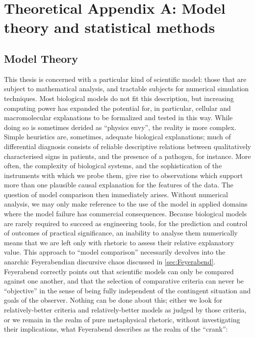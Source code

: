 \chapter{Theoretical Appendix A: Model theory and statistical methods}
\label{chap:theoryA}

\section{Model Theory}
\label{modeltheory}
This thesis is concerned with a particular kind of scientific model: those that are subject to mathematical analysis, and tractable subjects for numerical simulation techniques. Most biological models do not fit this description, but increasing computing power has expanded the potential for, in particular, cellular and macromolecular explanations to be formalized and tested in this way. While doing so is sometimes derided as ``physics envy'', the reality is more complex. Simple heuristics are, sometimes, adequate biological explanations; much of differential diagnosis consists of reliable descriptive relations between qualitatively characterised signs in patients, and the presence of a pathogen, for instance. More often, the complexity of biological systems, and the sophistication of the instruments with which we probe them, give rise to observations which support more than one plausible causal explanation for the features of the data. The question of model comparison then immediately arises. Without numerical analysis, we may only make reference to the use of the model in applied domains where the model failure has commercial consequences. Because biological models are rarely required to succeed as engineering tools, for the prediction and control of outcomes of practical significance, an inability to analyse them numerically means that we are left only with rhetoric to assess their relative explanatory value. This approach to ``model comparison'' necessarily devolves into the anarchic Feyerabendian discursive chaos discussed in \autoref{sec:Feyerabend}. Feyerabend correctly points out that scientific models can only be compared against one another, and that the selection of comparative criteria can never be ``objective'' in the sense of being fully independent of the contingent situation and goals of the observer. Nothing can be done about this; either we look for relatively-better criteria and relatively-better models as judged by those criteria, or we remain in the realm of pure metaphysical rhetoric, without investigating their implications, what Feyerabend describes as the realm of the ``crank'':

